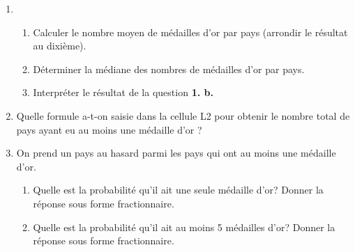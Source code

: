 \begin{enumerate}
\item 
	\begin{enumerate}
		\item Calculer le nombre moyen de médailles d'or par pays (arrondir le résultat au dixième).
		\item Déterminer la médiane des nombres de médailles d'or par pays.
		\item Interpréter le résultat de la question \textbf{1. b.}
	\end{enumerate}
\item Quelle formule a-t-on saisie dans la cellule L2 pour obtenir le nombre total de pays ayant eu au moins une médaille d'or ?
\item On prend un pays au hasard parmi les pays qui ont au moins une médaille d'or.
	\begin{enumerate}
		\item Quelle est la probabilité qu'il ait une seule médaille d'or? Donner la réponse sous forme fractionnaire.
		\item Quelle est la probabilité qu'il ait au moins 5 médailles d'or? Donner la réponse sous forme fractionnaire.
	\end{enumerate}
\end{enumerate}

\vspace{0,5cm}

